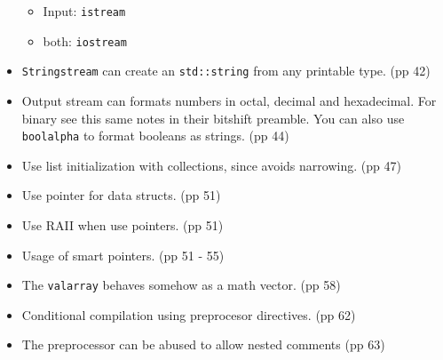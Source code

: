 \begin{itemize}
\begin{itemize}
  \item Input: \texttt{istream}
  \item both: \texttt{iostream}
 \end{itemize}
  \item \texttt{Stringstream} can create an \texttt{std::string} from any printable type. (pp 42)
  \item Output stream can formats numbers in octal, decimal and hexadecimal. For binary see this same notes in their bitshift preamble. You can also use \texttt{boolalpha} to format booleans as strings. (pp 44)
  \item Use list initialization with collections, since avoids narrowing. (pp 47)
  \item Use pointer for data structs. (pp 51)
  \item Use RAII when use pointers. (pp 51)
  \item Usage of smart pointers. (pp 51 - 55)
  \item The \texttt{valarray} behaves somehow as a math vector. (pp 58)
  \item Conditional compilation using preprocesor directives. (pp 62)
  \item The preprocessor can be abused to allow nested comments (pp 63)
\end{itemize}

